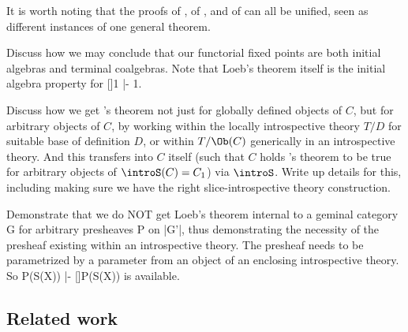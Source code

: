
It is worth noting that the proofs of , of , and of  can all be unified, seen as different instances of one general theorem. 

\begin{TODOblock}
Discuss how we may conclude that our functorial fixed points are both initial algebras and terminal coalgebras. Note that Loeb's theorem itself is the initial algebra property for []1 |- 1.
\end{TODOblock}

\begin{TODOblock}
Discuss how we get \Loeb's theorem not just for globally defined objects of $C$, but for arbitrary objects of $C$, by working within the locally introspective theory $T/D$ for suitable base of definition $D$, or within $T/\Ob(C)$ generically in an introspective theory. And this transfers into $C$ itself (such that $C$ holds \Loeb's theorem to be true for arbitrary objects of $\introS(C) = C_1$) via $\introS$. Write up details for this, including making sure we have the right slice-introspective theory construction.
\end{TODOblock}

\begin{TODOblock}
Demonstrate that we do NOT get Loeb's theorem internal to a geminal category G for arbitrary presheaves P on |G'|, thus demonstrating the necessity of the presheaf existing within an introspective theory. The presheaf needs to be parametrized by a parameter from an object of an enclosing introspective theory. So P(S(X)) |- []P(S(X)) is available.
\end{TODOblock}

\subsection{Related work}
